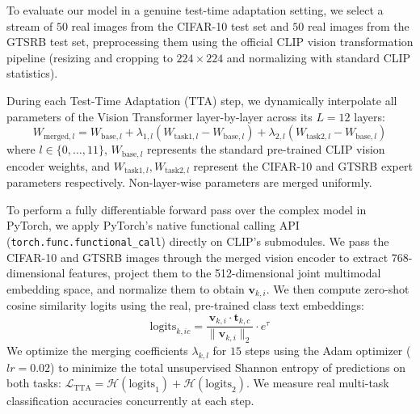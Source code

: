 To evaluate our model in a genuine test-time adaptation setting, we select a stream of $50$ real images from the CIFAR-10 test set and $50$ real images from the GTSRB test set, preprocessing them using the official CLIP vision transformation pipeline (resizing and cropping to $224 \times 224$ and normalizing with standard CLIP statistics).

During each Test-Time Adaptation (TTA) step, we dynamically interpolate all parameters of the Vision Transformer layer-by-layer across its $L=12$ layers:
\begin{equation}
W_{\text{merged}, l} = W_{\text{base}, l} + \lambda_{1, l} (W_{\text{task1}, l} - W_{\text{base}, l}) + \lambda_{2, l} (W_{\text{task2}, l} - W_{\text{base}, l})
\end{equation}
where $l \in \{0, \dots, 11\}$, $W_{\text{base}, l}$ represents the standard pre-trained CLIP vision encoder weights, and $W_{\text{task1}, l}, W_{\text{task2}, l}$ represent the CIFAR-10 and GTSRB expert parameters respectively. Non-layer-wise parameters are merged uniformly.

To perform a fully differentiable forward pass over the complex model in PyTorch, we apply PyTorch's native functional calling API (\texttt{torch.func.functional\_call}) directly on CLIP's submodules. We pass the CIFAR-10 and GTSRB images through the merged vision encoder to extract 768-dimensional features, project them to the 512-dimensional joint multimodal embedding space, and normalize them to obtain $\boldsymbol{v}_{k, i}$. We then compute zero-shot cosine similarity logits using the real, pre-trained class text embeddings:
\begin{equation}
\text{logits}_{k, ic} = \frac{\boldsymbol{v}_{k, i} \cdot \boldsymbol{t}_{k, c}}{\|\boldsymbol{v}_{k, i}\|_2} \cdot e^{\tau}
\end{equation}
We optimize the merging coefficients $\lambda_{k, l}$ for $15$ steps using the Adam optimizer ($lr = 0.02$) to minimize the total unsupervised Shannon entropy of predictions on both tasks: $\mathcal{L}_{\text{TTA}} = \mathcal{H}(\text{logits}_{1}) + \mathcal{H}(\text{logits}_{2})$. We measure real multi-task classification accuracies concurrently at each step.

